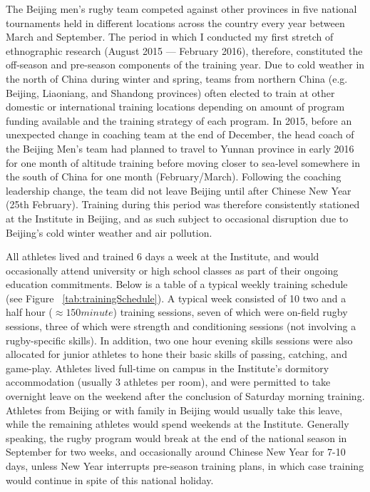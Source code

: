 \begin{CJK}{UTF8}{gbsn}
The Beijing men's rugby team competed against other provinces in five national tournaments held in different locations across the country every year between March and September.  The period in which I conducted my first stretch of ethnographic research (August 2015 --- February 2016), therefore, constituted the off-season and pre-season components of the training year.  Due to cold weather in the north of China during winter and spring, teams from northern China (e.g. Beijing, Liaoniang, and Shandong provinces) often elected to train at other domestic or international training locations depending on amount of program funding available and the training strategy of each program.  In 2015, before an unexpected change in coaching team at the end of December, the head coach of the Beijing Men's team had planned to travel to Yunnan province in early 2016 for one month of altitude training before moving closer to sea-level somewhere in the south of China for one month (February/March).  Following the coaching leadership change, the team did not leave Beijing until after Chinese New Year (25th February). Training during this period was therefore consistently stationed at the Institute in Beijing, and as such subject to occasional disruption due to Beijing's cold winter weather and air pollution.

All athletes lived and trained 6 days a week at the Institute, and would occasionally attend university or high school classes as part of their ongoing education commitments.  Below is a table of a typical weekly training schedule (see Figure ~\ref{tab:trainingSchedule}). A typical week consisted of 10 two and a half hour ($\approx 150 minute$) training sessions, seven of which were on-field rugby sessions, three of which were strength and conditioning sessions (not involving a rugby-specific skills).  In addition, two one hour evening skills sessions were also allocated for junior athletes to hone their basic skills of passing, catching, and game-play.  Athletes lived full-time on campus in the Institute's dormitory accommodation (usually 3 athletes per room), and were permitted to take overnight leave on the weekend after the conclusion of Saturday morning training.  Athletes from Beijing or with family in Beijing would usually take this leave, while the remaining athletes would spend weekends at the Institute.  Generally speaking, the rugby program would break at the end of the national season in September for two weeks, and occasionally around Chinese New Year for 7-10 days, unless New Year interrupts pre-season training plans, in which case training would continue in spite of this national holiday.


\end{CJK}
